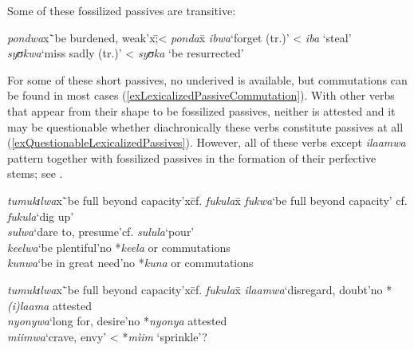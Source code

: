Some of these fossilized passives are transitive:
\begin{exe}
\ex
\begin{tabbing}
\textit{pondwa}x\=`be burdened, weak'x\=;< \textit{ponda}x\=\kill%
\textit{ibwa}\>`forget (tr.)'\> < \textit{iba}\> \lq steal'\\
\textit{syʊkwa}\>`miss sadly (tr.)'\> < \textit{syʊka}\> \lq be resurrected'
\end{tabbing}
\end{exe}

For some of these short passives, no underived  is available, but commutations can be found in most cases (\ref{exLexicalizedPassiveCommutation}). With other verbs that appear from their shape to be fossilized passives, neither is attested and it may be questionable whether diachronically these verbs constitute passives at all (\ref{exQuestionableLexicalizedPassives}). However, all of these verbs except \textit{ilaamwa} pattern together with fossilized passives in the formation of their perfective stems; see .
\clearpage

\begin{exe}
\ex \label{exLexicalizedPassiveCommutation}
\begin{tabbing}
\textit{tumukɪlwa}x\=`be full beyond capacity'x\=cf. \textit{fukula}x\=\kill%
\textit{fukwa}\>`be full beyond capacity'\> cf. \textit{fukula}\>`dig up'\\
\textit{sulwa}\>`dare to, presume'\>cf. \textit{sulula}\>`pour'\\
\textit{keelwa}\>`be plentiful'\>no *\textit{keela} or commutations\\%
\textit{kunwa}\>`be in great need'\>no *\textit{kuna} or commutations
\end{tabbing}
\ex \label{exQuestionableLexicalizedPassives}
\begin{tabbing}
\textit{tumukɪlwa}x\=`be full beyond capacity'x\=cf. \textit{fukula}x\=\kill%
\textit{ilaamwa}\>`disregard, doubt'\>no *\textit{(i)laama} attested\\
\textit{nyonywa}\>`long for, desire'\>no *\textit{nyonya} attested\\
\textit{miimwa}\>`crave, envy'\> < *\textit{mìim} `sprinkle'?
\end{tabbing}
\end{exe}

